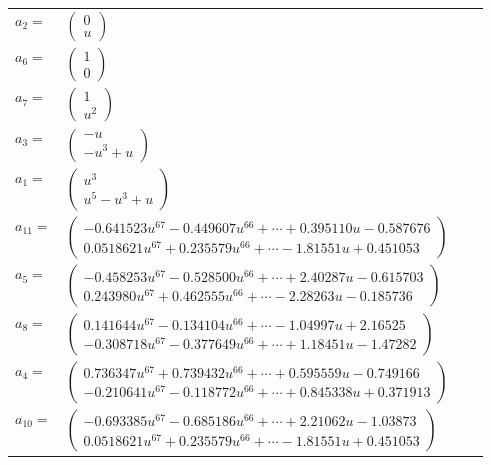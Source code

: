 \documentclass[1p]{elsarticle_modified}
\theoremstyle{definition}
\begin{document}
\begin{tabular}{m{7pt} m{180pt} m{7pt} m{180pt} }
\flushright $a_{2}=$&$\begin{pmatrix}0\\u\end{pmatrix}$ \\
\flushright $a_{6}=$&$\begin{pmatrix}1\\0\end{pmatrix}$ \\
\flushright $a_{7}=$&$\begin{pmatrix}1\\u^2\end{pmatrix}$ \\
\flushright $a_{3}=$&$\begin{pmatrix}- u\\- u^3+u\end{pmatrix}$ \\
\flushright $a_{1}=$&$\begin{pmatrix}u^3\\u^5- u^3+u\end{pmatrix}$ \\
\flushright $a_{11}=$&$\begin{pmatrix}-0.641523 u^{67}-0.449607 u^{66}+\cdots+0.395110 u-0.587676\\0.0518621 u^{67}+0.235579 u^{66}+\cdots-1.81551 u+0.451053\end{pmatrix}$ \\
\flushright $a_{5}=$&$\begin{pmatrix}-0.458253 u^{67}-0.528500 u^{66}+\cdots+2.40287 u-0.615703\\0.243980 u^{67}+0.462555 u^{66}+\cdots-2.28263 u-0.185736\end{pmatrix}$ \\
\flushright $a_{8}=$&$\begin{pmatrix}0.141644 u^{67}-0.134104 u^{66}+\cdots-1.04997 u+2.16525\\-0.308718 u^{67}-0.377649 u^{66}+\cdots+1.18451 u-1.47282\end{pmatrix}$ \\
\flushright $a_{4}=$&$\begin{pmatrix}0.736347 u^{67}+0.739432 u^{66}+\cdots+0.595559 u-0.749166\\-0.210641 u^{67}-0.118772 u^{66}+\cdots+0.845338 u+0.371913\end{pmatrix}$ \\
\flushright $a_{10}=$&$\begin{pmatrix}-0.693385 u^{67}-0.685186 u^{66}+\cdots+2.21062 u-1.03873\\0.0518621 u^{67}+0.235579 u^{66}+\cdots-1.81551 u+0.451053\end{pmatrix}$ \\

\end{tabular}
\end{document}
